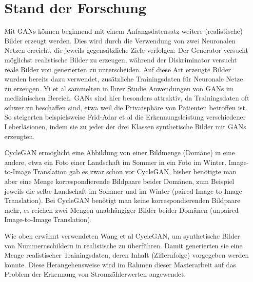 \chapter*{Stand der Forschung}
Mit GANs\cite{gan} können beginnend mit einem Anfangsdatensatz weitere (realistische) Bilder erzeugt werden.
Dies wird durch die Verwendung von zwei Neuronalen Netzen erreicht, die jeweils gegensätzliche Ziele verfolgen:
Der Generator versucht möglichst realistische Bilder zu erzeugen, während der Diskriminator versucht reale Bilder von generierten zu unterscheiden.
Auf diese Art erzeugte Bilder wurden bereits dazu verwendet, zusätzliche Trainingsdaten für Neuronale Netze zu erzeugen.
Yi et al\cite{medic} sammelten in Ihrer Studie Anwendungen von GANs im medizinischen Bereich. GANs sind hier besonders attraktiv, da Trainingsdaten oft
schwer zu beschaffen sind, etwa weil die Privatsphäre von Patienten betroffen ist.
So steigerten beispielsweise Frid-Adar et al\cite{liver} die Erkennungsleistung verschiedener Leberläsionen,
indem sie zu jeder der drei Klassen synthetische Bilder mit GANs erzeugten.

CycleGAN\cite{cyclegan} ermöglicht eine Abbildung von einer Bildmenge (Domäne) in eine andere, etwa ein Foto einer Landschaft im Sommer in ein Foto im Winter.
Image-to-Image Translation gab es zwar schon vor CycleGAN, bisher benötigte man aber eine Menge korrespondierende Bildpaare beider Domänen, zum Beispiel jeweils die selbe Landschaft im Sommer und im Winter (paired Image-to-Image Translation).
Bei CycleGAN benötigt man keine korrespondierenden Bildpaare mehr, es reichen zwei Mengen unabhängiger Bilder beider Domänen (unpaired Image-to-Image Translation).

Wie oben erwähnt verwendeten Wang et al\cite{lplate} CycleGAN, um synthetische Bilder von Nummernschildern in realistische zu überführen. Damit generierten sie 
eine Menge realistischer Trainingsdaten, deren Inhalt (Ziffernfolge) vorgegeben werden konnte.
Diese Herangehensweise wird im Rahmen dieser Masterarbeit auf das Problem der Erkennung von Stromzählerwerten angewendet.
